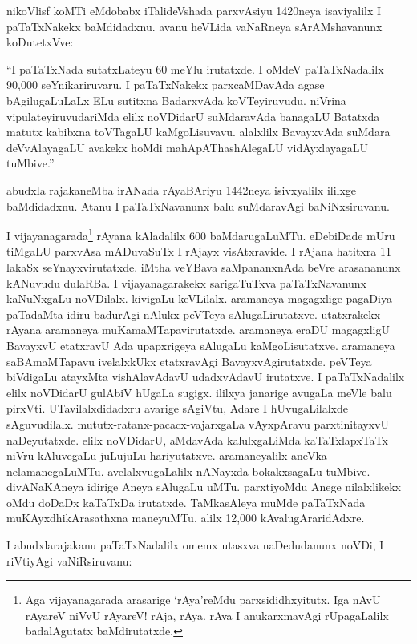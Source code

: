\documentclass[11pt,a4size]{article}
\begin{document}
nikoVlisf koMTi eMdobabx iTalideVshada parxvAsiyu 1420neya isaviyalilx
I paTaTxNakekx baMdidadxnu. avanu heVLida vaNaRneya sArAMshavanunx
koDutetxVve:

``I paTaTxNada sutatxLateyu 60 meYlu irutatxde. I oMdeV paTaTxNadalilx
90,000 seYnikariruvaru. I paTaTxNakekx parxcaMDavAda agase
bAgilugaLuLaLx ELu sutitxna BadarxvAda koVTeyiruvudu. niVrina
vipulateyiruvudariMda elilx noVDidarU suMdaravAda banagaLU Batatxda
matutx kabibxna toVTagaLU kaMgoLisuvavu. alalxlilx BavayxvAda suMdara
deVvAlayagaLU avakekx hoMdi mahApAThashAlegaLU vidAyxlayagaLU
tuMbive.''

abudxla rajakaneMba irANada rAyaBAriyu 1442neya isivxyalilx ililxge
baMdidadxnu. Atanu I paTaTxNavanunx balu suMdaravAgi baNiNxsiruvanu.

I vijayanagarada\footnote[1]{Aga vijayanagarada arasarige `rAya'reMdu
  parxsididhxyitutx. Iga nAvU rAyareV niVvU rAyareV! rAja, rAya. rAva
  I anukarxmavAgi rUpagaLalilx badalAgutatx baMdirutatxde.} rAyana
  kAladalilx 600 baMdarugaLuMTu. eDebiDade mUru tiMgaLU parxvAsa
  mADuvaSuTx I rAjayx visAtxravide. I rAjana hatitxra 11 lakaSx
  seYnayxvirutatxde. iMtha veYBava saMpananxnAda beVre arasananunx
  kANuvudu dulaRBa. I vijayanagarakekx sarigaTuTxva paTaTxNavanunx
  kaNuNxgaLu noVDilalx. kivigaLu keVLilalx. aramaneya magagxlige
  pagaDiya paTadaMta idiru badurAgi nAlukx peVTeya
  sAlugaLirutatxve. utatxrakekx rAyana aramaneya
  muKamaMTapavirutatxde. aramaneya eraDU magagxligU BavayxvU etatxravU
  Ada upapxrigeya sAlugaLu kaMgoLisutatxve. aramaneya saBAmaMTapavu
  ivelalxkUkx etatxravAgi BavayxvAgirutatxde. peVTeya biVdigaLu
  atayxMta vishAlavAdavU udadxvAdavU irutatxve. I paTaTxNadalilx elilx
  noVDidarU gulAbiV hUgaLa sugigx. ililxya janarige avugaLa meVle balu
  pirxVti. UTavilalxdidadxru avarige sAgiVtu, Adare I hUvugaLilalxde
  sAguvudilalx. mututx-ratanx-pacacx-vajarxgaLa vAyxpAravu
  parxtinitayxvU naDeyutatxde. elilx noVDidarU, aMdavAda
  kalulxgaLiMda kaTaTxlapxTaTx niVru-kAluvegaLu juLujuLu
  hariyutatxve. aramaneyalilx aneVka
  nelamanegaLuMTu. avelalxvugaLalilx nANayxda bokakxsagaLu
  tuMbive. divANaKAneya idirige Aneya sAlugaLu uMTu. parxtiyoMdu Anege
  nilalxlikekx oMdu doDaDx kaTaTxDa irutatxde. TaMkasAleya muMde
  paTaTxNada muKAyxdhikArasathxna maneyuMTu. alilx 12,000
  kAvalugAraridAdxre.

I abudxlarajakanu paTaTxNadalilx omemx utasxva naDedudanunx noVDi, I
riVtiyAgi vaNiRsiruvanu:
\end{document}
